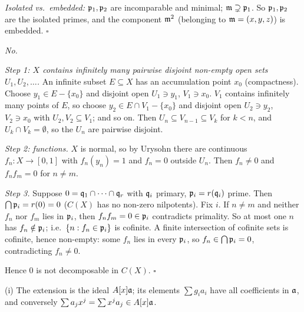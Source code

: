 \documentclass[11pt]{article}
\begin{document}
\emph{Isolated vs.\ embedded:} $\mathfrak p_1,\mathfrak p_2$ are incomparable and minimal; $\mathfrak m\supsetneq\mathfrak p_1$. So $\mathfrak p_1,\mathfrak p_2$ are the isolated primes, and the component $\mathfrak m^2$ (belonging to $\mathfrak m=(x,y,z)$) is embedded. \hfill$\square$

\pf
\emph{No.}

\emph{Step 1: $X$ contains infinitely many pairwise disjoint non-empty open sets $U_1,U_2,\dots$.} An infinite subset $E\subseteq X$ has an accumulation point $x_0$ (compactness). Choose $y_1\in E-\{x_0\}$ and disjoint open $U_1\ni y_1$, $V_1\ni x_0$. $V_1$ contains infinitely many points of $E$, so choose $y_2\in E\cap V_1-\{x_0\}$ and disjoint open $U_2\ni y_2$, $V_2\ni x_0$ with $U_2,V_2\subseteq V_1$; and so on. Then $U_n\subseteq V_{n-1}\subseteq V_k$ for $k<n$, and $U_k\cap V_k=\emptyset$, so the $U_n$ are pairwise disjoint.

\emph{Step 2: functions.} $X$ is normal, so by Urysohn there are continuous $f_n:X\to[0,1]$ with $f_n(y_n)=1$ and $f_n=0$ outside $U_n$. Then $f_n\ne0$ and $f_nf_m=0$ for $n\ne m$.

\emph{Step 3.} Suppose $0=\mathfrak q_1\cap\dots\cap\mathfrak q_r$ with $\mathfrak q_i$ primary, $\mathfrak p_i=r(\mathfrak q_i)$ prime. Then $\bigcap\mathfrak p_i=r(0)=0$ ($C(X)$ has no non-zero nilpotents). Fix $i$. If $n\ne m$ and neither $f_n$ nor $f_m$ lies in $\mathfrak p_i$, then $f_nf_m=0\in\mathfrak p_i$ contradicts primality. So at most one $n$ has $f_n\notin\mathfrak p_i$; i.e.\ $\{n:f_n\in\mathfrak p_i\}$ is cofinite. A finite intersection of cofinite sets is cofinite, hence non-empty: some $f_n$ lies in every $\mathfrak p_i$, so $f_n\in\bigcap\mathfrak p_i=0$, contradicting $f_n\ne0$.

Hence $0$ is not decomposable in $C(X)$. \hfill$\square$

\pf
(i) The extension is the ideal $A[x]\mathfrak a$; its elements $\sum g_ia_i$ have all coefficients in $\mathfrak a$, and conversely $\sum a_jx^j=\sum x^j a_j\in A[x]\mathfrak a$.
\end{document}
